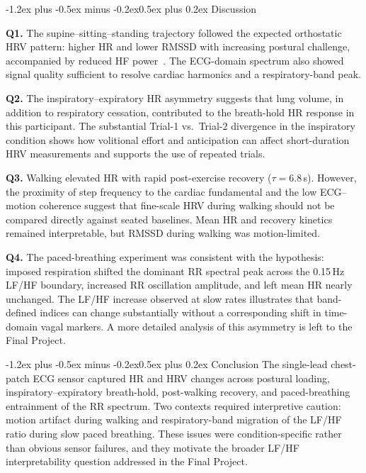 \documentclass[11pt,a4paper]{article}
\makeatletter
\renewcommand\section{\@startsection{section}{1}{\z@}%
  {-1.2ex plus -0.5ex minus -0.2ex}{0.5ex plus 0.2ex}%
  {\normalfont\large\bfseries}}
\makeatother
\begin{document}
\section{Discussion}

\textbf{Q1.} The supine--sitting--standing trajectory followed the
expected orthostatic HRV pattern: higher HR and lower RMSSD with
increasing postural challenge, accompanied by reduced HF
power~\cite{taskforce1996,shaffer2017}. The ECG-domain spectrum also
showed signal quality sufficient to resolve cardiac harmonics and a
respiratory-band peak.

\textbf{Q2.} The inspiratory--expiratory HR asymmetry suggests that lung
volume, in addition to respiratory cessation, contributed to the
breath-hold HR response in this participant. The substantial Trial-1
vs.\ Trial-2 divergence in the inspiratory condition shows how volitional
effort and anticipation can affect short-duration HRV measurements and
supports the use of repeated trials.

\textbf{Q3.} Walking elevated HR with rapid post-exercise recovery
($\tau = 6.8$\,s). However, the proximity of step frequency to the
cardiac fundamental and the low ECG--motion coherence suggest that
fine-scale HRV during walking should not be compared directly against
seated baselines. Mean HR and recovery kinetics remained interpretable,
but RMSSD during walking was motion-limited.

\textbf{Q4.} The paced-breathing experiment was consistent with the
hypothesis: imposed respiration shifted the dominant RR spectral peak
across the 0.15\,Hz LF/HF boundary, increased RR oscillation amplitude,
and left mean HR nearly unchanged. The LF/HF increase observed at slow
rates illustrates that band-defined indices can change substantially
without a corresponding shift in time-domain vagal markers. A more
detailed analysis of this asymmetry is left to the Final Project.

\section{Conclusion}
The single-lead chest-patch ECG sensor captured HR and HRV changes across
postural loading, inspiratory--expiratory breath-hold, post-walking
recovery, and paced-breathing entrainment of the RR spectrum. Two contexts
required interpretive caution: motion artifact during walking and
respiratory-band migration of the LF/HF ratio during slow paced breathing.
These issues were condition-specific rather than obvious sensor failures,
and they motivate the broader LF/HF interpretability question addressed
in the Final Project.
\end{document}
